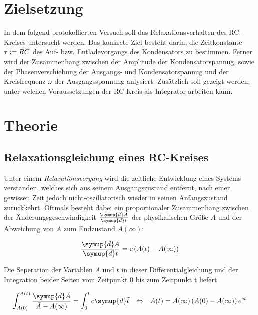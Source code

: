 


\section{Zielsetzung}
\label{sec:Zielsetzung}
In dem folgend protokollierten Versuch soll das Relaxationsverhalten des RC-Kreises untersucht werden. Das konkrete
Ziel besteht darin, die Zeitkonstante $\tau \vcentcolon = RC$ des Auf- bzw. Entladevorgangs des Kondensators zu bestimmen.
Ferner wird der Zusammenhang zwischen der Amplitude der Kondensatorspannug, sowie der Phasenverschiebung der Ausgangs- und
Kondensatorspannug und der Kreisfrequenz $\omega$ der Ausgangsspannung anlysiert. Zusätzlich soll gezeigt werden, unter 
welchen Voraussetzungen der RC-Kreis als Integrator arbeiten kann.

\section{Theorie}
\label{sec:Theorie}

\subsection{Relaxationsgleichung eines RC-Kreises}
Unter einem \emph{Relaxationsvorgang} wird die zeitliche Entwicklung eines Systems verstanden, welches sich aus seinem 
Ausgangszustand entfernt, nach einer gewissen Zeit jedoch nicht-oszillatorisch wieder in seinen Anfangszustand zurückkehrt.
Oftmals besteht dabei ein proportionaler Zusammenhang zwischen der Änderungsgeschwindigkeit $\frac{\symup{d}A}{\symup{d}t}$
der physikalischen Größe $A$ und der Abweichung von $A$ zum Endzustand $A\left(\infty\right)$:

\begin{equation}
\label{eqn:Proportionalitaet}
    \frac{\symup{d}A}{\symup{d}t} = c\left(A(t) - A(\infty)\right)
\end{equation}

\noindent Die Seperation der Variablen $A$ und $t$ in dieser Differentialgleichung und der Integration beider Seiten vom Zeitpunkt 0
bis zum Zeitpunkt t liefert

\begin{align}
\label{eqn:Amplitudenverlauf}
    \int_{A(0)}^{A(t)}\frac{\symup{d}\tilde{A}}{\tilde{A} - A(\infty)} &= \int_{0}^{t}c\symup{d}\tilde{t}  &\Leftrightarrow & &A(t) = A(\infty) \left(A(0) - A(\infty)\right)e^{ct}
\end{align}

